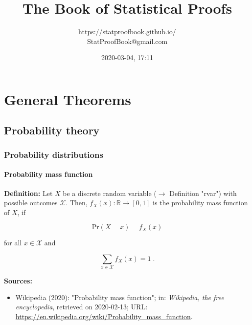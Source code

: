 \documentclass[a4paper,12pt]{book}
\title{\Huge{The Book of Statistical Proofs}}
\author{https://statproofbook.github.io/ \\ StatProofBook@gmail.com}
\date{2020-03-04, 17:11}
\begin{document}
\maketitle

\pagebreak
{}
\tableofcontents

\newpage
{}


\chapter{General Theorems} \label{sec:General Theorems} \newpage

\pagebreak
\section{Probability theory}

\subsection{Probability distributions}

\subsubsection[\textit{Probability mass function}]{Probability mass function} \label{sec:pmf}

\vspace{1em}
\textbf{Definition:} Let $X$ be a discrete random variable ($\rightarrow$ Definition "rvar") with possible outcomes $\mathcal{X}$. Then, $f_X(x): \mathbb{R} \to [0,1]$ is the probability mass function of $X$, if

\begin{equation} \label{eq:pmf-pmf-def-s1}
\mathrm{Pr}(X = x) = f_X(x)
\end{equation}

for all $x \in \mathcal{X}$ and

\begin{equation} \label{eq:pmf-pmf-def-s2}
\sum_{x \in \mathcal{X}} f_X(x) = 1 \; .
\end{equation}

\vspace{1em}
\textbf{Sources:}
\begin{itemize}
\item Wikipedia (2020): "Probability mass function"; in: \textit{Wikipedia, the free encyclopedia}, retrieved on 2020-02-13; URL: \url{https://en.wikipedia.org/wiki/Probability_mass_function}.
\end{itemize}
\end{document}
